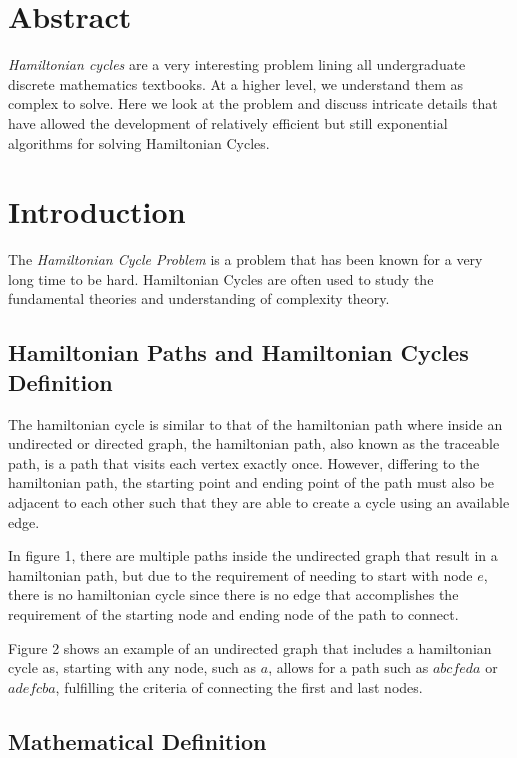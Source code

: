 \newpage

\section{Abstract}

\emph{Hamiltonian cycles} are a very interesting problem lining all
undergraduate discrete mathematics textbooks. At a higher level, we understand
them as complex to solve. Here we look at the problem and discuss intricate
details that have allowed the development of relatively efficient but still
exponential algorithms for solving Hamiltonian Cycles.

\section{Introduction}

The \emph{Hamiltonian Cycle Problem} is a problem that has been known for a very
long time to be hard. Hamiltonian Cycles are often used to study the fundamental
theories and understanding of complexity theory.

\subsection{Hamiltonian Paths and Hamiltonian Cycles Definition}

The hamiltonian cycle is similar to that of the hamiltonian path where inside an
undirected or directed graph, the hamiltonian path, also known as the traceable
path, is a path that visits each vertex exactly once. However, differing to the
hamiltonian path, the starting point and ending point of the path must also be
adjacent to each other such that they are able to create a cycle using an
available edge.


In figure 1, there are multiple paths inside the undirected graph that result in
a hamiltonian path, but due to the requirement of needing to start with node
$e$, there is no hamiltonian cycle since there is no edge that accomplishes the
requirement of the starting node and ending node of the path to connect.

Figure 2 shows an example of an undirected graph that includes a hamiltonian
cycle as, starting with any node, such as $a$, allows for a path such as
$abcfeda$ or $adefcba$, fulfilling the criteria of connecting the first and last
nodes.

\subsection{Mathematical Definition}

